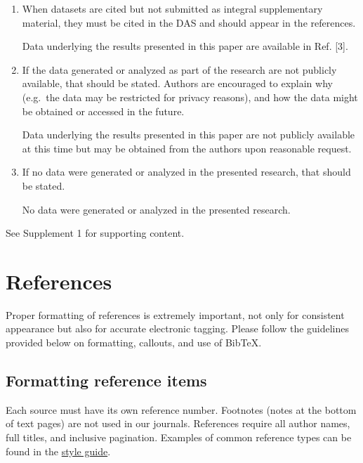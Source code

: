 \documentclass{osa-article}
\begin{document}
\begin{verbatm}
\begin{backmatter}
\begin{enumerate}
\item When datasets are cited but not submitted as integral supplementary material, they must be cited in the DAS and should appear in the references.

 Data underlying the results presented in this paper are available in Ref. [3].

\bigskip

\item If the data generated or analyzed as part of the research are not publicly available, that should be stated. Authors are encouraged to explain why (e.g.~the data may be restricted for privacy reasons), and how the data might be obtained or accessed in the future.

 Data underlying the results presented in this paper are not publicly available at this time but may be obtained from the authors upon reasonable request.

\bigskip

\item If no data were generated or analyzed in the presented research, that should be stated.

 No data were generated or analyzed in the presented research.
\end{enumerate}


See Supplement 1 for supporting content. 

\end{backmatter}

\section{References}
\label{sec:refs}
Proper formatting of references is extremely important, not only for consistent appearance but also for accurate electronic tagging. Please follow the guidelines provided below on formatting, callouts, and use of Bib\TeX.

\subsection{Formatting reference items}
Each source must have its own reference number. Footnotes (notes at the bottom of text pages) are not used in our journals. References require all author names, full titles, and inclusive pagination. Examples of common reference types can be found in the  \href{https://www.osapublishing.org/submit/style/osa-styleguide.cfm} {style guide}.



\end{verbatm}
\end{document}
